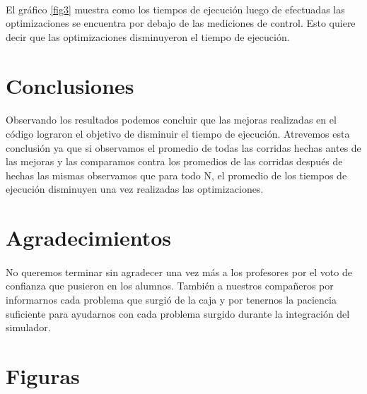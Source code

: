 \documentclass{article}
\begin{document}
\paragraph{}
El gráfico \ref {fig3} muestra como los tiempos de ejecución luego de efectuadas las optimizaciones se encuentra por debajo de las mediciones de control. Esto quiere decir que las optimizaciones disminuyeron el tiempo de ejecución.

\section{Conclusiones}

\paragraph{}
Observando los resultados podemos concluir que las mejoras realizadas en el código lograron el objetivo de disminuir el tiempo de ejecución. Atrevemos esta conclusión ya que si observamos el promedio de todas las corridas hechas antes de las mejoras y las comparamos contra los promedios de las corridas después de hechas las mismas observamos que para todo N, el promedio de los tiempos de ejecución disminuyen una vez realizadas las optimizaciones.

\section{Agradecimientos}

\paragraph{}
No queremos terminar sin agradecer una vez más a los profesores por el voto de confianza que pusieron en los alumnos. También a nuestros compañeros por informarnos cada problema que surgió de la caja y por tenernos la paciencia suficiente para ayudarnos con cada problema surgido durante la integración del simulador.

\clearpage

\section{Figuras}
\end{document}
